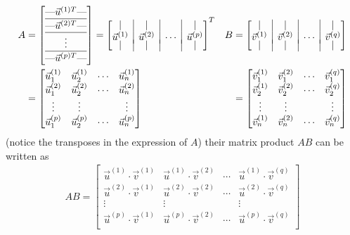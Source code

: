 \begin{align*}
A &= \left[\begin{array}{@{}c@{}}
\text{---} \vec{u}^{(1)T} \text{---} \\
\hline
\text{---} \vec{u}^{(2)T} \text{---} \Tstrut \\
\hline
\vdots \\
\hline
\text{---} \vec{u}^{(p)T} \text{---} \Tstrut
\end{array}\right]
=  \left[\begin{array}{@{}c|c|c|c@{}}
| & | & & | \\
\vec{u}^{(1)} & \vec{u}^{(2)} & \cdots & \vec{u}^{(p)} \\[-4pt]
| & | & & |
\end{array}\right]^T
& B &= \left[\begin{array}{@{}c|c|c|c@{}}
| & | & & | \\
\vec{v}^{(1)} & \vec{v}^{(2)} & \cdots & \vec{v}^{(q)} \\[-4pt]
| & | & & |
\end{array}\right]\\
&= 
\begin{bmatrix}
\vec{u}^{(1)}_1  & \vec{u}^{(1)}_2 & \cdots & \vec{u}^{(1)}_n \\
\vec{u}^{(2)}_1  & \vec{u}^{(2)}_2 & \cdots & \vec{u}^{(2)}_n \\
\vdots & \vdots & & \vdots \\
\vec{u}^{(p)}_1  & \vec{u}^{(p)}_2 & \cdots & \vec{u}^{(p)}_n
\end{bmatrix} 
& &= 
\begin{bmatrix}
\vec{v}^{(1)}_1  & \vec{v}^{(2)}_1 & \cdots & \vec{v}^{(q)}_1 \\
\vec{v}^{(1)}_2  & \vec{v}^{(2)}_2 & \cdots & \vec{v}^{(q)}_2 \\
\vdots & \vdots & & \vdots \\
\vec{v}^{(1)}_n  & \vec{v}^{(2)}_n & \cdots & \vec{v}^{(q)}_n \\
\end{bmatrix} 
\end{align*}
(notice the transposes in the expression of $A$) their matrix product $AB$ can be written as
\begin{align*}
AB =
\begin{bmatrix}
\vec{u}^{(1)} \cdot \vec{v}^{(1)} & \vec{u}^{(1)} \cdot \vec{v}^{(2)} & \cdots & \vec{u}^{(1)} \cdot \vec{v}^{(q)} \\
\vec{u}^{(2)} \cdot \vec{v}^{(1)} & \vec{u}^{(2)} \cdot \vec{v}^{(2)} & \cdots & \vec{u}^{(2)} \cdot \vec{v}^{(q)} \\
\vdots & \vdots & & \vdots \\
\vec{u}^{(p)} \cdot \vec{v}^{(1)} & \vec{u}^{(p)} \cdot \vec{v}^{(2)} & \cdots & \vec{u}^{(p)} \cdot \vec{v}^{(q)} \\
\end{bmatrix}
\end{align*}
